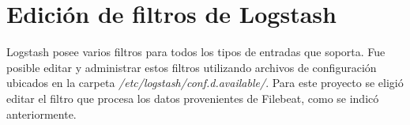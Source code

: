 \chapter{Edición de filtros de Logstash}
Logstash posee varios filtros para todos los tipos de entradas que soporta.
Fue posible editar y administrar estos filtros utilizando archivos de configuración ubicados en la carpeta \textit{/etc/logstash/conf.d.available/}. Para este proyecto se eligió editar el filtro que procesa los datos provenientes de Filebeat, como se indicó anteriormente.\par


    


 
  

